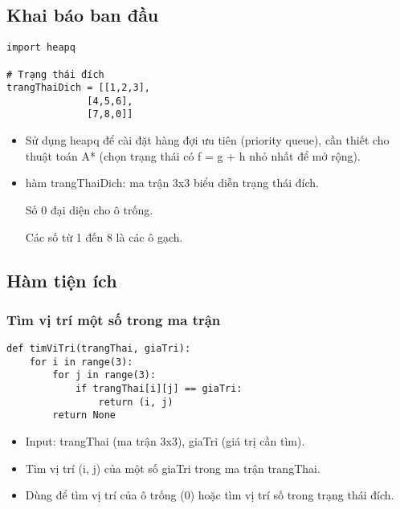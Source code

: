 \documentclass{article}
\begin{document}
\subsection{Khai báo ban đầu}
\begin{verbatim}
import heapq

# Trạng thái đích
trangThaiDich = [[1,2,3],
              [4,5,6],
              [7,8,0]]
\end{verbatim}
\begin{itemize}
    \item Sử dụng heapq để cài đặt hàng đợi ưu tiên (priority queue), cần thiết cho thuật toán A* (chọn trạng thái có f = g + h nhỏ nhất để mở rộng).
    \item hàm trangThaiDich: ma trận 3x3 biểu diễn trạng thái đích.

    Số 0 đại diện cho ô trống.


    Các số từ 1 đến 8 là các ô gạch.

\end{itemize}
\subsection{Hàm tiện ích}
\subsubsection{Tìm vị trí một số trong ma trận}
\begin{verbatim}
def timViTri(trangThai, giaTri):
    for i in range(3):
        for j in range(3):
            if trangThai[i][j] == giaTri:
                return (i, j)
        return None

\end{verbatim}
\begin{itemize}
    \item Input: trangThai (ma trận 3x3), giaTri (giá trị cần tìm).
    \item Tìm vị trí (i, j) của một số giaTri trong ma trận trangThai.
    \item Dùng để tìm vị trí của ô trống (0) hoặc tìm vị trí số trong trạng thái đích.
\end{itemize}
\end{document}
